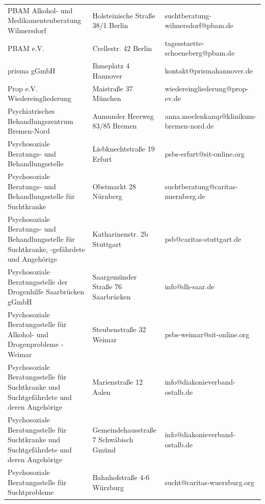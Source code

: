 {\begin{xltabular}{\textwidth} {
 >{\raggedright\arraybackslash}p{5cm}
 >{\raggedright\arraybackslash}X
 >{\raggedright\arraybackslash}p{5cm} }
PBAM Alkohol- und Medikamentenberatung Wilmersdorf & Holsteinische Straße 38/1 Berlin & suchtberatung-wilmersdorf@pbam.de \\
PBAM e.V. & Crellestr. 42 Berlin & tagesstaette-schoeneberg@pbam.de \\
prisma gGmbH & Ihmeplatz 4 Hannover & kontakt@prismahannover.de \\
Prop e.V. Wiedereingliederung & Maistraße 37 München & wiedereingliederung@prop-ev.de \\
Psychiatrisches Behandlungszentrum Bremen-Nord & Aumunder Heerweg 83/85 Bremen & anna.moelenkamp@klinikum-bremen-nord.de \\
Psychosoziale Beratungs- und Behandlungsstelle & Liebknechtstraße 19 Erfurt & psbs-erfurt@sit-online.org \\
Psychosoziale Beratungs- und Behandlungsstelle für Suchtkranke & Obstmarkt 28 Nürnberg & suchtberatung@caritas-nuernberg.de \\
Psychosoziale Beratungs- und Behandlungsstelle für Suchtkranke, -gefährdete und Angehörige & Katharinenstr. 2b Stuttgart & psb@caritas-stuttgart.de \\
Psychosoziale Beratungsstelle der Drogenhilfe Saarbrücken gGmbH & Saargemünder Straße 76 Saarbrücken & info@dh-saar.de \\
Psychosoziale Beratungsstelle für Alkohol- und Drogenprobleme - Weimar & Steubenstraße 32 Weimar & psbs-weimar@sit-online.org \\
Psychosoziale Beratungsstelle für Suchtkranke und Suchtgefährdete und deren Angehörige & Marienstraße 12 Aalen & info@diakonieverband-ostalb.de \\
Psychosoziale Beratungsstelle für Suchtkranke und Suchtgefährdete und deren Angehörige & Gemeindehausstraße 7 Schwäbisch Gmünd & info@diakonieverband-ostalb.de \\
Psychosoziale Beratungsstelle für Suchtprobleme & Bahnhofstraße 4-6 Würzburg & sucht@caritas-wuerzburg.org \\

\end{xltabular}}
